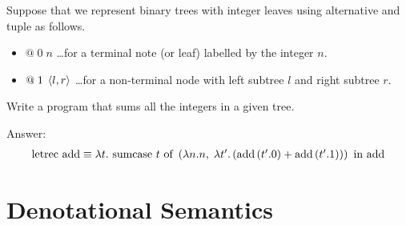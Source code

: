 \begin{enumcirc}
	Suppose that we represent binary trees with integer leaves using alternative
	and tuple as follows.
	\begin{itemize}
		\item
		      $@ \; 0 \; n$ \dots for a terminal note (or leaf) labelled by the integer $n$.
		\item
		      $@ \; 1 \; \left\langle l, r \right\rangle$ \dots for a non-terminal node with left subtree $l$ and right subtree $r$.
	\end{itemize}
	Write a program that sums all the integers in a given tree.

	Answer:
	\[
		\begin{array}{l}
			\textrm{letrec } \textrm{add} \equiv \lambda t . 
				\textrm{ sumcase } t \textrm{ of } \left( 
					\lambda n . n,\;
					\lambda t' . \left( \textrm{add} \left( t' . 0 \right) + \textrm{add} \left( t' . 1 \right) \right)
				 \right)
			 \textrm{ in } \textrm{add}
		\end{array}
	\]
\end{enumcirc}

\section{Denotational Semantics}

